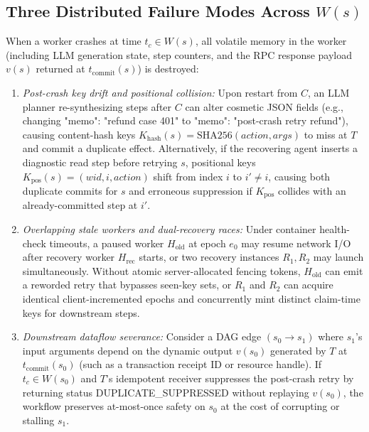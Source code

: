 \documentclass[10pt,journal]{IEEEtran}
\def\texttt#1{#1}%
\theoremstyle{definition}
\theoremstyle{remark}
\begin{document}
\subsection{Three Distributed Failure Modes Across \texorpdfstring{$W(s)$}{W(s)}}
When a worker crashes at time $t_c \in W(s)$, all volatile memory in the worker (including LLM generation state, step counters, and the RPC response payload $v(s)$ returned at $t_{\mathrm{commit}}(s)$) is destroyed:
\begin{enumerate}
  \item \emph{Post-crash key drift and positional collision:} Upon restart from $C$, an LLM planner re-synthesizing steps after $C$ can alter cosmetic JSON fields (e.g., changing \texttt{"memo": "refund case 401"} to \texttt{"memo": "post-crash retry refund"}), causing content-hash keys $K_{\mathrm{hash}}(s) = \mathrm{SHA256}(\mathit{action}, \mathit{args})$ to miss at $T$ and commit a duplicate effect. Alternatively, if the recovering agent inserts a diagnostic read step before retrying $s$, positional keys $K_{\mathrm{pos}}(s) = (\mathit{wid}, i, \mathit{action})$ shift from index $i$ to $i' \neq i$, causing both duplicate commits for $s$ and erroneous suppression if $K_{\mathrm{pos}}$ collides with an already-committed step at $i'$.
  \item \emph{Overlapping stale workers and dual-recovery races:} Under container health-check timeouts, a paused worker $H_{\mathrm{old}}$ at epoch $e_0$ may resume network I/O after recovery worker $H_{\mathrm{rec}}$ starts, or two recovery instances $R_1, R_2$ may launch simultaneously. Without atomic server-allocated fencing tokens, $H_{\mathrm{old}}$ can emit a reworded retry that bypasses seen-key sets, or $R_1$ and $R_2$ can acquire identical client-incremented epochs and concurrently mint distinct claim-time keys for downstream steps.
  \item \emph{Downstream dataflow severance:} Consider a DAG edge $(s_0 \to s_1)$ where $s_1$'s input arguments depend on the dynamic output $v(s_0)$ generated by $T$ at $t_{\mathrm{commit}}(s_0)$ (such as a transaction receipt ID or resource handle). If $t_c \in W(s_0)$ and $T$'s idempotent receiver suppresses the post-crash retry by returning status \texttt{DUPLICATE\_SUPPRESSED} without replaying $v(s_0)$, the workflow preserves at-most-once safety on $s_0$ at the cost of corrupting or stalling $s_1$.
\end{enumerate}

\end{document}
